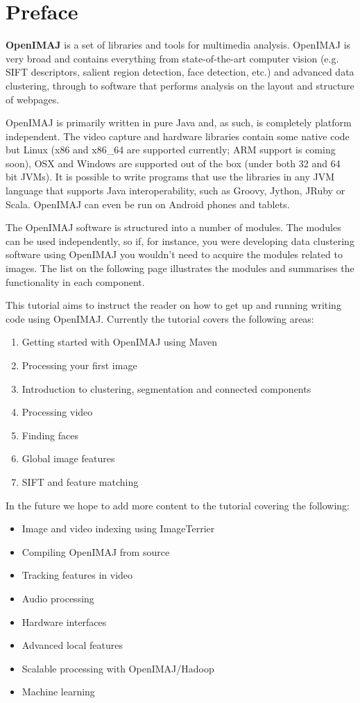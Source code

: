\chapter*{Preface}\normalsize
{}
\pagestyle{plain}

\textbf{OpenIMAJ} is a set of libraries and tools for multimedia analysis. 
OpenIMAJ is very broad and contains everything from state-of-the-art computer 
vision (e.g. SIFT descriptors, salient region detection, face detection, etc.) 
and advanced data clustering, through to software that performs analysis on the 
layout and structure of webpages.

OpenIMAJ is primarily written in pure Java and, as such, is completely platform 
independent. The video capture and hardware libraries contain some native code 
but Linux (x86 and x86\_64 are supported currently; ARM support is coming soon), 
OSX and Windows are supported out of the box (under both 32 and 64 bit JVMs). 
It is possible to write programs that use the libraries in any JVM language 
that supports Java interoperability, such as Groovy, Jython, JRuby or 
Scala. OpenIMAJ can even be run on Android phones and tablets.

The OpenIMAJ software is structured into a number of modules. The modules 
can be used independently, so if, for instance, you were developing data 
clustering software using OpenIMAJ you wouldn't need to acquire the modules related 
to images. The list on the following page illustrates the modules 
and summarises the functionality in each component.

This tutorial aims to instruct the reader on how to get up and running
writing code using OpenIMAJ. Currently the tutorial covers the following areas:
\begin{enumerate}
	\item Getting started with OpenIMAJ using Maven
	\item Processing your first image
	\item Introduction to clustering, segmentation and connected components
	\item Processing video
	\item Finding faces
	\item Global image features
	\item SIFT and feature matching
\end{enumerate}

In the future we hope to add more content to the tutorial covering the following:
\begin{itemize}
	\item Image and video indexing using ImageTerrier
	\item Compiling OpenIMAJ from source
	\item Tracking features in video
	\item Audio processing
	\item Hardware interfaces
	\item Advanced local features
	\item Scalable processing with OpenIMAJ/Hadoop
	\item Machine learning
\end{itemize}

